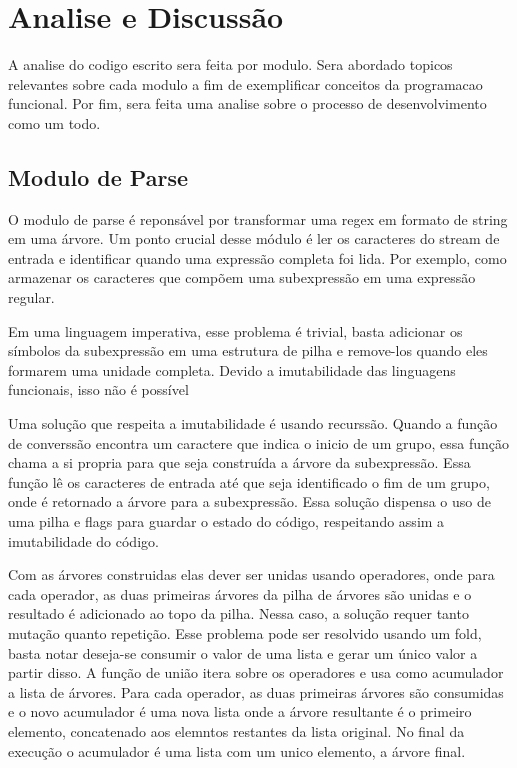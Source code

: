 \section{Analise e Discussão}

A analise do codigo escrito sera feita por modulo.
Sera abordado topicos relevantes sobre cada modulo a fim de exemplificar conceitos da programacao funcional.
Por fim, sera feita uma analise sobre o processo de desenvolvimento como um todo.

\subsection{Modulo de Parse}

O modulo de parse é reponsável por transformar uma regex em formato de string em uma árvore.
Um ponto crucial desse módulo é ler os caracteres do stream de entrada e identificar quando uma expressão completa foi lida.
Por exemplo, como armazenar os caracteres que compõem uma subexpressão em uma expressão regular.

Em uma linguagem imperativa, esse problema é trivial, basta adicionar os símbolos da subexpressão em uma estrutura de pilha e remove-los quando eles formarem uma unidade completa.
Devido a imutabilidade das linguagens funcionais, isso não é possível

Uma solução que respeita a imutabilidade é usando recurssão.
Quando a função de converssão encontra um caractere que indica o inicio de um grupo, essa função chama a si propria para que seja construída a árvore da subexpressão.
Essa função lê os caracteres de entrada até que seja identificado o fim de um grupo, onde é retornado a árvore para a subexpressão.
Essa solução dispensa o uso de uma pilha e flags para guardar o estado do código, respeitando assim a imutabilidade do código.

Com as árvores construidas elas dever ser unidas usando operadores, onde para cada operador, as duas primeiras árvores da pilha de árvores são unidas e o resultado é adicionado ao topo da pilha.
Nessa caso, a solução requer tanto mutação quanto repetição.
Esse problema pode ser resolvido usando um fold, basta notar deseja-se consumir o valor de uma lista e gerar um único valor a partir disso.
A função de união itera sobre os operadores e usa como acumulador a lista de árvores.
Para cada operador, as duas primeiras árvores são consumidas e o novo acumulador é uma nova lista onde a árvore resultante é o primeiro elemento, concatenado aos elemntos restantes da lista original.
No final da execução o acumulador é uma lista com um unico elemento, a árvore final.

